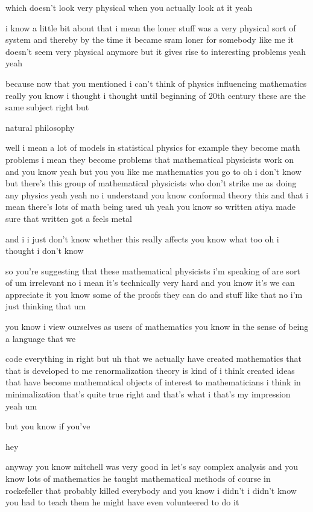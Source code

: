 \begin{description}
which doesn't look very physical when you actually look at it yeah

i know a little bit about that i mean the loner stuff was a very physical sort of system and thereby by the time it became sram loner for somebody like me it doesn't seem very physical anymore but it gives rise to interesting problems yeah yeah

because now that you mentioned i can't think of physics influencing mathematics really you know i thought i thought until beginning of 20th century these are the same subject right but

natural philosophy

well i mean a lot of models in statistical physics for example they become math problems i mean they become problems that mathematical physicists work on and you know yeah but you you like me mathematics you go to oh i don't know but there's this group of mathematical physicists who don't strike me as doing any physics yeah yeah no i understand you know conformal theory this and that i mean there's lots of math being used uh yeah you know so written atiya made sure that written got a feels metal

and i i just don't know whether this really affects you know what too oh i thought i don't know

so you're suggesting that these mathematical physicists i'm speaking of are sort of um irrelevant no i mean it's technically very hard and you know it's we can appreciate it you know some of the proofs they can do and stuff like that no i'm just thinking that um

you know i view ourselves as users of mathematics you know in the sense of being a language that we

code everything in right but uh that we actually have created mathematics that that is developed to me renormalization theory is kind of i think created ideas that have become mathematical objects of interest to mathematicians i think in minimalization that's quite true right and that's what i that's my impression yeah um

but you know if you've

hey

anyway you know mitchell was very good in let's say complex analysis and you know lots of mathematics he taught mathematical methods of course in rockefeller that probably killed everybody and you know i didn't i didn't know you had to teach them he might have even volunteered to do it


\end{description}
